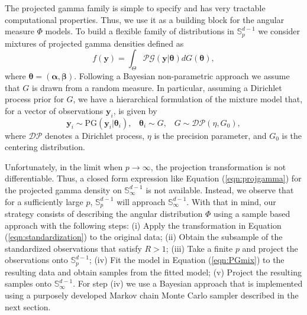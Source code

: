   
  The projected gamma family is simple to specify and has very tractable computational properties. Thus, we use it as a building block for the angular measure $\Phi$ models. To build a flexible family of distributions in ${\mathbb S}_p^{d-1}$ we consider mixtures of projected gamma densities defined as
  \begin{equation} \label{eqn:PGmix}     
     f(\bm{y}) = \int_\Theta \mathcal{PG}(\bm{y}|\bm{\theta}) dG(\bm{\theta}), 
  \end{equation} 
  where $\bm{\theta} = (\bm{\alpha}, \bm{\beta})$. Following a Bayesian non-parametric approach \citep{Ferguson74,Antoniak1974} we assume that $G$ is drawn from a random measure. In particular, assuming a Dirichlet process prior for $G$, we have a hierarchical formulation of the mixture model that, for a vector of observations $\bm{y}_i$, is given by
  \begin{equation}\label{eqn:dppg}    \bm{y}_i \sim \text{PG}(\bm{y}_i|\bm{\theta}_i) , \;\;\; \bm{\theta}_i \sim G, \;\;\; G \sim \mathcal{DP}(\eta, G_0),
  \end{equation}
  where $\mathcal{DP}$ denotes a Dirichlet process, $\eta$ is the precision parameter, and $G_0$ is the centering distribution. 
  
  Unfortunately, in the limit when $p\rightarrow \infty$, the 
  projection transformation is not differentiable. Thus, a closed form expression 
  like Equation (\ref{eqn:projgamma}) for the projected gamma density on ${\mathbb S}_\infty^{d-1}$ is not 
  available. Instead, we observe that for a sufficiently large $p$, $\mathbb{S}_p^{d-1}$ will approach
  $\mathbb{S}_{\infty}^{d-1}$.  With that in mind, our strategy consists of describing the angular
  distribution $\Phi$ using a sample based approach with the following steps: (i) Apply the 
  transformation in Equation (\ref{eqn:standardization}) to the original data; (ii) Obtain the 
  subsample of the standardized observations that satisfy $R>1$; (iii) Take a finite $p$ and 
  project the observations onto ${\mathbb S}_p^{d-1}$; 
  (iv) Fit the model in Equation (\ref{eqn:PGmix}) to the resulting 
  data and obtain samples from the fitted model; 
  (v) Project the resulting samples onto ${\mathbb S}_\infty^{d-1}$.
  For step (iv) we use a Bayesian approach that is implemented using a purposely developed Markov chain Monte Carlo sampler described in the next section.

